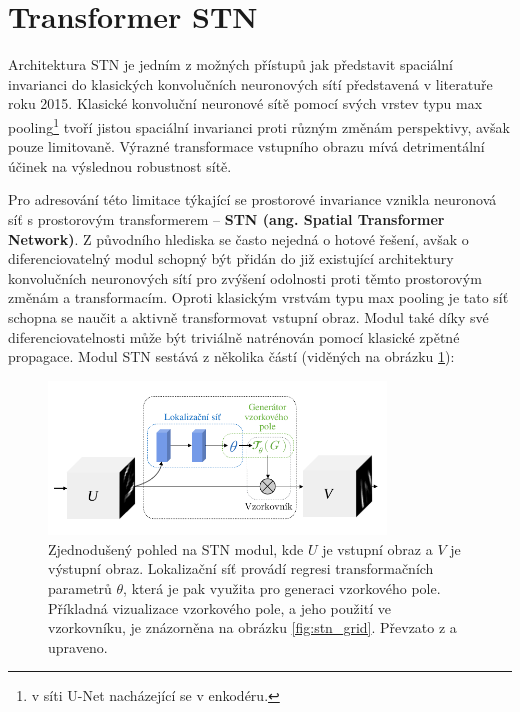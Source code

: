 \section{Transformer STN}
\label{sec:Chapter28}

Architektura STN je jedním z možných přístupů jak představit spaciální invarianci do klasických konvolučních neuronových sítí představená v literatuře \cite{stn} roku 2015. Klasické konvoluční neuronové sítě pomocí svých vrstev typu max pooling\footnote{v síti U-Net nacházející se v enkodéru.} tvoří jistou spaciální invarianci proti různým změnám perspektivy, avšak pouze limitovaně. Výrazné transformace vstupního obrazu mívá detrimentální účinek na výslednou robustnost sítě.

Pro adresování této limitace týkající se prostorové invariance vznikla neuronová síť s prostorovým transformerem -- \textbf{STN (ang. Spatial Transformer Network)}. Z původního hlediska se často nejedná o hotové řešení, avšak o diferenciovatelný modul schopný být přidán do již existující architektury konvolučních neuronových sítí pro zvýšení odolnosti proti těmto prostorovým změnám a transformacím. Oproti klasickým vrstvám typu max pooling je tato síť schopna se naučit a aktivně transformovat vstupní obraz. Modul také díky své diferenciovatelnosti může být triviálně natrénován pomocí klasické zpětné propagace. Modul STN sestává z několika částí (viděných na obrázku \ref{fig:stn_overview}):

\begin{figure}[ht]
\centering
\includegraphics[width=0.8\textwidth,keepaspectratio]{Figures/stn/stn_module.pdf}
\caption[Zjednodušený pohled na STN modul]
{Zjednodušený pohled na STN modul, kde $U$ je vstupní obraz a $V$ je výstupní obraz. Lokalizační síť provádí regresi transformačních parametrů $\theta$, která je pak využita pro generaci vzorkového pole. Příkladná vizualizace vzorkového pole, a jeho použití ve vzorkovníku, je znázorněna na obrázku \ref{fig:stn_grid}. Převzato z \cite{stn} a upraveno. }
\label{fig:stn_overview}
\end{figure}

